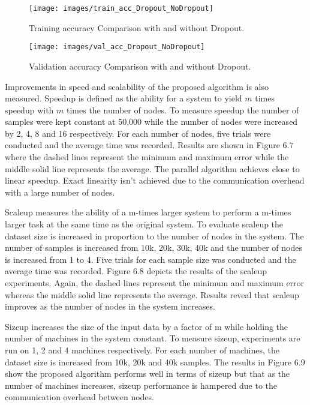 \documentclass[12pt]{report}
\begin{document}
\begin{figure}[]
\centering
\texttt{[image: images/train\_acc\_Dropout\_NoDropout]}
\caption{Training accuracy Comparison with and without Dropout.}
\end{figure}


\begin{figure}[]
\centering
\texttt{[image: images/val\_acc\_Dropout\_NoDropout]}
\caption{Validation accuracy Comparison with and without Dropout.}
\end{figure}

Improvements in speed and scalability of the proposed algorithm is also measured.
Speedup is defined as the ability for a system to yield $m$ times speedup with $m$ times the number of nodes. To measure speedup the number of samples were kept constant at 50,000 while the number of nodes were increased by 2, 4, 8 and 16 respectively.  For each number of nodes, five trials were conducted and the average time was recorded. Results are shown in Figure 6.7 where the dashed lines represent the minimum and maximum error while the middle solid line represents the average. The parallel algorithm achieves close to linear speedup. Exact linearity isn't achieved due to the communication overhead with a large number of nodes. 

Scaleup measures the ability of a m-times larger system to perform a m-times larger task at the same time as the original system.  To evaluate scaleup the dataset size is increased in proportion to the number of nodes in the system. The number of samples is increased from 10k, 20k, 30k, 40k and the number of nodes is increased from 1 to 4. Five trials for each sample size was conducted and the average time was recorded. Figure 6.8 depicts the results of the scaleup experiments. Again, the dashed lines represent the minimum and maximum error whereas the middle solid line represents the average. Results reveal that scaleup improves as the number of nodes in the system increases.

Sizeup increases the size of the input data by a factor of m while holding the number of machines in the system constant. To measure sizeup, experiments are run on 1, 2 and 4 machines respectively. For each number of machines, the dataset size is increased from 10k, 20k and 40k samples. The results in Figure 6.9 show the proposed algorithm performs well in terms of sizeup but that as the number of machines increases, sizeup performance is hampered due to the communication overhead between nodes.
\end{document}
